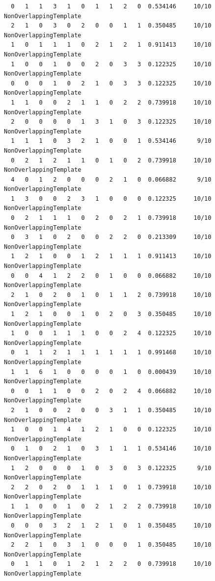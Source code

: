 \documentclass[12pt, titlepage]{report}
\theoremstyle{definition}
\begin{document}
{\begin{verbatim}
  0   1   1   3   1   0   1   1   2   0  0.534146     10/10      NonOverlappingTemplate
  2   1   0   3   0   2   0   0   1   1  0.350485     10/10      NonOverlappingTemplate
  1   0   1   1   1   0   2   1   2   1  0.911413     10/10      NonOverlappingTemplate
  1   0   0   1   0   0   2   0   3   3  0.122325     10/10      NonOverlappingTemplate
  0   0   0   1   0   2   1   0   3   3  0.122325     10/10      NonOverlappingTemplate
  1   1   0   0   2   1   1   0   2   2  0.739918     10/10      NonOverlappingTemplate
  2   0   0   0   0   1   3   1   0   3  0.122325     10/10      NonOverlappingTemplate
  1   1   1   0   3   2   1   0   0   1  0.534146      9/10      NonOverlappingTemplate
  0   2   1   2   1   1   0   1   0   2  0.739918     10/10      NonOverlappingTemplate
  4   0   1   2   0   0   0   2   1   0  0.066882      9/10      NonOverlappingTemplate
  1   3   0   0   2   3   1   0   0   0  0.122325     10/10      NonOverlappingTemplate
  0   2   1   1   1   0   2   0   2   1  0.739918     10/10      NonOverlappingTemplate
  0   3   1   0   2   0   0   2   2   0  0.213309     10/10      NonOverlappingTemplate
  1   2   1   0   0   1   2   1   1   1  0.911413     10/10      NonOverlappingTemplate
  0   0   4   1   2   2   0   1   0   0  0.066882     10/10      NonOverlappingTemplate
  2   1   0   2   0   1   0   1   1   2  0.739918     10/10      NonOverlappingTemplate
  1   2   1   0   0   1   0   2   0   3  0.350485     10/10      NonOverlappingTemplate
  1   0   0   1   1   1   0   0   2   4  0.122325     10/10      NonOverlappingTemplate
  0   1   1   2   1   1   1   1   1   1  0.991468     10/10      NonOverlappingTemplate
  1   1   6   1   0   0   0   0   1   0  0.000439     10/10      NonOverlappingTemplate
  0   0   1   1   0   0   2   0   2   4  0.066882     10/10      NonOverlappingTemplate
  2   1   0   0   2   0   0   3   1   1  0.350485     10/10      NonOverlappingTemplate
  1   0   0   1   4   1   2   1   0   0  0.122325     10/10      NonOverlappingTemplate
  0   1   0   2   1   0   3   1   1   1  0.534146     10/10      NonOverlappingTemplate
  1   2   0   0   0   1   0   3   0   3  0.122325      9/10      NonOverlappingTemplate
  2   2   0   2   0   1   1   1   0   1  0.739918     10/10      NonOverlappingTemplate
  1   1   0   0   1   0   2   1   2   2  0.739918     10/10      NonOverlappingTemplate
  0   0   0   3   2   1   2   1   0   1  0.350485     10/10      NonOverlappingTemplate
  2   2   1   0   3   1   0   0   0   1  0.350485     10/10      NonOverlappingTemplate
  0   1   1   0   1   2   1   2   2   0  0.739918     10/10      NonOverlappingTemplate

\end{verbatim}}
\end{document}
